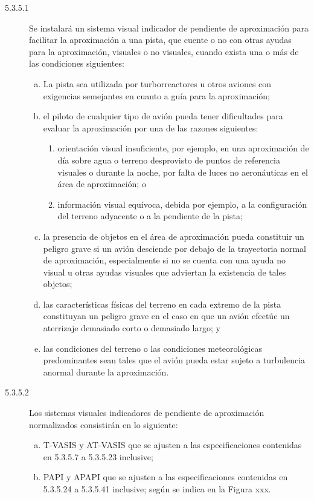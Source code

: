 \begin{tcolorbox}[title=Requerimientos OACI. Anexo 14. Volumen I. Edición 2018.
  5.3.5 Sistemas visuales indicadores de pendiente de aproximación]

  {\footnotesize

    \begin{description}
    \item [5.3.5.1] Se instalará un sistema visual indicador de pendiente de aproximación para facilitar la aproximación a una pista, que cuente o no con otras ayudas para la aproximación, visuales o no visuales, cuando exista una o más de las condiciones
siguientes:
\begin{enumerate}[a)]
\item La pista sea utilizada por turborreactores u otros aviones
  con exigencias semejantes en cuanto a guía para la aproximación; 
\item el piloto de cualquier tipo de avión pueda tener dificultades para
  evaluar la aproximación por una de las razones siguientes:

  \begin{enumerate}[1)]
  \item orientación visual insuficiente, por ejemplo, en una
    aproximación de día sobre agua o terreno desprovisto de puntos de
    referencia visuales o durante la noche, por falta de luces no
    aeronáuticas en el área de aproximación; o 
  \item información visual
    equívoca, debida por ejemplo, a la configuración del terreno
    adyacente o a la pendiente de la pista;
\end{enumerate}
\item la presencia de objetos en el área de aproximación pueda constituir un peligro grave si un avión desciende por debajo de la trayectoria normal de aproximación, especialmente si no se cuenta con una ayuda no visual u otras ayudas visuales que adviertan la existencia de tales objetos;
\item las características físicas del terreno en cada extremo de la pista constituyan un peligro grave en el caso en que un avión efectúe un aterrizaje demasiado corto o demasiado largo; y
\item las condiciones del terreno o las condiciones meteorológicas predominantes sean tales que el avión pueda estar sujeto a turbulencia anormal durante la aproximación.
\end{enumerate}
\item[5.3.5.2] Los sistemas visuales indicadores de pendiente de aproximación normalizados consistirán en lo siguiente:
  \begin{enumerate}[a)]
  \item  T-VASIS y AT-VASIS que se ajusten a las especificaciones
    contenidas en 5.3.5.7 a 5.3.5.23 inclusive; 
  \item PAPI y APAPI que se
    ajusten a las especificaciones contenidas en 5.3.5.24 a 5.3.5.41
    inclusive; según se indica en la Figura xxx.
  \end{enumerate}
  

\end{description}}
\end{tcolorbox}
